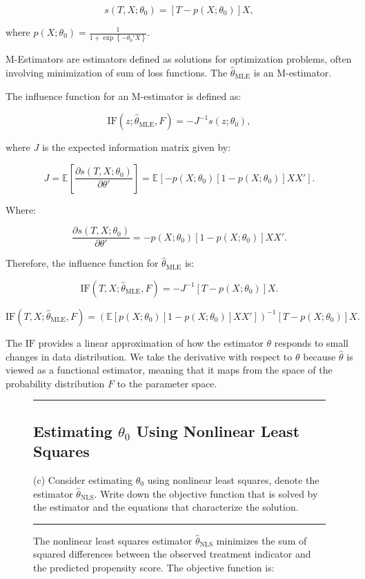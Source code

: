 \documentclass{article}
\newenvironment{colorparagraph}[1]{\par\color{#1}}{\par}
\begin{document}
\[
s(T, X; \theta_0) = [T - p(X; \theta_0)] X,
\]

where \( p(X; \theta_0) = \frac{1}{1 + \exp\left\{ - \theta_0' X \right\}} \).

M-Estimators are estimators defined as solutions for optimization problems, often involving minimization of sum of loss functions. The \( \hat{\theta}_{\text{MLE}} \) is an M-estimator.

The influence function for an M-estimator is defined as:

\[
\text{IF}(z; \hat{\theta}_{\text{MLE}}, F) = -J^{-1} s(z; \theta_0),
\]

where \( J \) is the expected information matrix given by:

\[
J = \mathbb{E}\left[ \frac{\partial s(T, X; \theta_0)}{\partial \theta'} \right] = \mathbb{E}\left[- p(X; \theta_0)[1 - p(X; \theta_0)] X X' \right].
\]

Where:

$$
\frac{\partial s(T, X; \theta_0)}{\partial \theta{\prime}} = -p(X; \theta_0)[1 - p(X; \theta_0)] X X'.
$$

Therefore, the influence function for \( \hat{\theta}_{\text{MLE}} \) is:

\[
\text{IF}(T, X; \hat{\theta}_{\text{MLE}}, F) = -J^{-1} [T - p(X; \theta_0)] X.
\]

\[
\text{IF}(T, X; \hat{\theta}_{\text{MLE}}, F) = \left( \mathbb{E}\left[ p(X; \theta_0) \left[ 1 - p(X; \theta_0) \right] X X' \right] \right)^{-1} \left[ T - p(X; \theta_0) \right] X.
\]

The $\text{IF}$ provides a linear approximation of how the estimator $\theta$ responds to small changes in data distribution. We take the derivative with respect to $\theta$ because $\hat{\theta}$ is viewed as a functional estimator, meaning that it maps from the space of the probability distribution $F$ to the parameter space.

\begin{figure}[H]
\begin{colorparagraph}{questioncolor}
\label{q1c}
\rule{\textwidth}{0.5pt}
\subsection{Estimating \( \theta_0 \) Using Nonlinear Least Squares}
(c) Consider estimating \( \theta_0 \) using nonlinear least squares, denote the estimator \( \hat{\theta}_{\text{NLS}} \).
Write down the objective function that is solved by the estimator and the equations that characterize the solution.

\rule{\textwidth}{0.5pt}
\end{colorparagraph}

The nonlinear least squares estimator \( \hat{\theta}_{\text{NLS}} \) minimizes the sum of squared differences between the observed treatment indicator and the predicted propensity score. The objective function is:
\end{figure}
\end{document}
